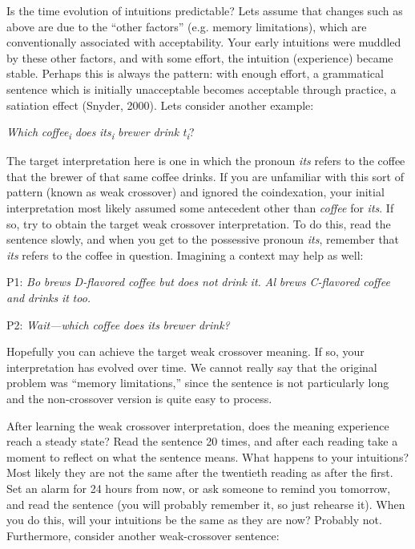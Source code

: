   Is the time evolution of intuitions predictable? Lets assume that changes such as above are due to the “other factors” (e.g. memory limitations), which are conventionally associated with acceptability. Your early intuitions were muddled by these other factors, and with some effort, the intuition (experience) became stable. Perhaps this is always the pattern: with enough effort, a grammatical sentence which is initially unacceptable becomes acceptable through practice, a satiation effect (Snyder, 2000). Lets consider another example:

    \textit{Which} \textit{coffee\textsubscript{i}} \textit{does} \textit{its\textsubscript{i}} \textit{brewer} \textit{drink} \textit{t\textsubscript{i}}?

  The target interpretation here is one in which the pronoun \textit{its} refers to the coffee that the brewer of that same coffee drinks. If you are unfamiliar with this sort of pattern (known as weak crossover) and ignored the coindexation, your initial interpretation most likely assumed some antecedent other than \textit{coffee} for \textit{its}. If so, try to obtain the target weak crossover interpretation. To do this, read the sentence slowly, and when you get to the possessive pronoun \textit{its}, remember that \textit{its} refers to the coffee in question. Imagining a context may help as well:

P1: \textit{Bo} \textit{brews} \textit{D-flavored} \textit{coffee} \textit{but} \textit{does} \textit{not} \textit{drink} \textit{it.} \textit{Al} \textit{brews} \textit{C-flavored} \textit{coffee} \textit{and} \textit{drinks} \textit{it} \textit{too.} 

P2: \textit{Wait—which} \textit{coffee} \textit{does} \textit{its} \textit{brewer} \textit{drink?}

  Hopefully you can achieve the target weak crossover meaning. If so, your interpretation has evolved over time. We cannot really say that the original problem was “memory limitations,” since the sentence is not particularly long and the non-crossover version is quite easy to process. 

  After learning the weak crossover interpretation, does the meaning experience reach a steady state? Read the sentence 20 times, and after each reading take a moment to reflect on what the sentence means. What happens to your intuitions? Most likely they are not the same after the twentieth reading as after the first. Set an alarm for 24 hours from now, or ask someone to remind you tomorrow, and read the sentence (you will probably remember it, so just rehearse it). When you do this, will your intuitions be the same as they are now? Probably not. Furthermore, consider another weak-crossover sentence: 

